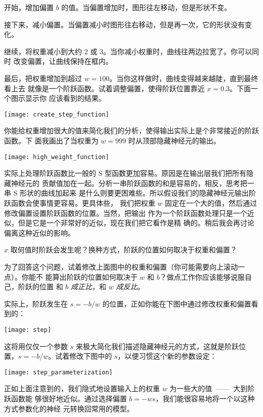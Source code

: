 开始，增加偏置 $b$ 的值。当偏置增加时，图形往左移动，但是形状不变。

接下来，减小偏置。当偏置减小时图形往右移动，但是再一次，它的形状没有变化。

继续，将权重减小到大约 $2$ 或 $3$。当你减小权重时，曲线往两边拉宽了。你可以同时
改变偏置，让曲线保持在框内。

最后，把权重增加到超过 $w = 100$。当你这样做时，曲线变得越来越陡，直到最终看上去
就像是一个阶跃函数。试着调整偏置，使得阶跃位置靠近 $x = 0.3$。下面一个图示显示你
应该看到的结果。
\begin{center}
  \texttt{[image: create\_step\_function]}
\end{center}

你能给权重增加很大的值来简化我们的分析，使得输出实际上是个非常接近的阶跃函数。下
面我画出了当权重为 $w = 999$ 时从顶部隐藏神经元的输出。
\begin{center}
  \texttt{[image: high\_weight\_function]}
\end{center}

实际上处理阶跃函数比一般的 S 型函数更加容易。原因是在输出层我们把所有隐藏神经元的
贡献值加在一起。分析一串阶跃函数的和是容易的，相反，思考把一串 S 形状的曲线加起来
是什么则要更困难些。所以假设我们的隐藏神经元输出阶跃函数会使事情更容易。更具体些，
我们把权重 $w$ 固定在一个大的值，然后通过修改偏置设置阶跃函数的位置。当然，把输出
作为一个阶跃函数处理只是一个近似，但是它是一个非常好的近似，现在我们把它看作是精
确的。稍后我会再讨论偏离这种近似的影响。

$x$ 取何值时阶跃会发生呢？换种方式，阶跃的位置如何取决于权重和偏置？

为了回答这个问题，试着修改上面图中的权重和偏置（你可能需要向上滚动一点）。你能不
能算出阶跃的位置如何取决于 $w$ 和 $b$？做点工作你应该能够说服自己，阶跃的位置
和 $b$ \emph{成正比}，和 $w$ \emph{成反比}。

实际上，阶跃发生在 $s = -b/w$ 的位置，正如你能在下图中通过修改权重和偏置看到的：
\begin{center}
  \texttt{[image: step]}
\end{center}

这将用仅仅一个参数 $s$ 来极大简化我们描述隐藏神经元的方式，这就是阶跃位置，$s =
-b/w$。试着修改下图中的 $s$，以便习惯这个新的参数设定：
\begin{center}
  \texttt{[image: step\_parameterization]}
\end{center}

正如上面注意到的，我们隐式地设置输入上的权重 $w$ 为一些大的值~——~大到阶跃函数能
够很好地近似。通过选择偏置 $b = -ws$，我们能很容易地将一个以这种方式参数化的神经
元转换回常用的模型。

